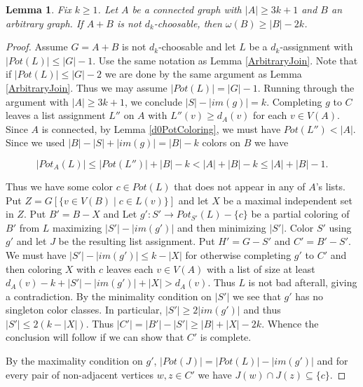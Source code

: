 \documentclass[12pt]{article}
\theoremstyle{plain}
\newtheorem{lem}[thm]{Lemma}
\theoremstyle{definition}
\theoremstyle{remark}
\begin{document}
\begin{lem}\label{ConnectedJoin}
 Fix $k \geq 1$.  Let $A$ be a connected graph with $|A| \geq 3k+1$ and $B$ an arbitrary graph.  If $A+B$ is not $d_k$-choosable, then
$\omega(B) \geq |B| - 2k$.
\end{lem}
\begin{proof}
Assume $G = A+B$ is not $d_k$-choosable and let $L$ be a $d_k$-assignment with $|Pot(L)| \leq |G| - 1$.  Use the same notation as Lemma \ref{ArbitraryJoin}.  Note that if $|Pot(L)| \leq |G| - 2$ we are done by the same argument as Lemma \ref{ArbitraryJoin}.  Thus we may assume $|Pot(L)| = |G| - 1$.  Running through the argument with $|A| \geq 3k+1$, we conclude $|S| - |im(g)| = k$.  Completing $g$ to $C$ leaves a list assignment $L''$ on $A$ with $L''(v) \geq d_A(v)$ for each $v \in V(A)$.  Since $A$ is connected, by Lemma \ref{d0PotColoring}, we must have $Pot(L'') < |A|$.  Since we used $|B| - |S| + |im(g)| = |B| - k$ colors on $B$ we have 

\[|Pot_A(L)| \leq |Pot(L'')| + |B| - k < |A| + |B| - k \leq |A| + |B| - 1.\]

Thus we have some color $c \in Pot(L)$ that does not appear in any of $A$'s lists.  Put $Z = G\left[\{v \in V(B) \mid c \in L(v)\}\right]$ and let $X$ be a maximal independent set in $Z$. Put $B' = B - X$ and Let $g':S' \rightarrow Pot_{S'}(L) - \{c\}$ be a partial coloring of $B'$ from $L$ maximizing $|S'| - |im(g')|$ and then minimizing $|S'|$.  Color $S'$ using $g'$ and let $J$ be the resulting list assignment. Put $H' = G - S'$ and $C' = B' - S'$. We must have $|S'| - |im(g')| \leq k - |X|$ for otherwise
completing $g'$ to $C'$ and then coloring $X$ with $c$ leaves 
each $v \in V(A)$ with a list of size at least $d_A(v) - k + |S'| - |im(g')| + |X| > d_A(v)$.  Thus $L$ is not bad afterall, giving 
a contradiction.  By the minimality condition on $|S'|$ we see that $g'$ has no singleton color classes.  In particular,
$|S'| \geq 2|im(g')|$ and thus $|S'| \leq 2(k - |X|)$.  Thus $|C'| = |B'| - |S'| \geq |B| + |X| - 2k$. Whence the conclusion will follow if we can show that $C'$ is complete.\newline

By the maximality condition on $g'$, $|Pot(J)| = |Pot(L)| - |im(g')|$ and 
for every pair of non-adjacent vertices $w, z \in C'$ we have $J(w) \cap J(z) \subseteq \{c\}$. \newline
 

\end{proof}
\end{document}
